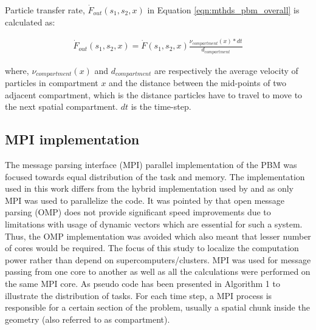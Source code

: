 \documentclass[preprint,10pt,authoryear]{elsarticle}
\begin{document}
\begin{linenumbers}
 Particle transfer rate, $\dot{F}_{out}(s_1,s_2,x)$ in Equation \ref{eqn:mthds_pbm_overall} is calculated 
as:

\begin{align}
\dot{F}_{out}(s_1,s_2,x) = \dot{F}(s_1,s_2,x)\frac{\nu_{compartment}(x)*dt}{d_{compartment}}
\label{eqn:mthds_f_out_dot_part_trans_rate}
\end{align}

where, $\nu_{compartment}(x)$ and $d_{compartment}$ are respectively the average velocity of 
particles in compartment $x$ and the distance between the mid-points of two adjacent compartment, 
which is the distance particles have to travel to move to the next spatial compartment. $dt$ is the 
time-step.

\subsection{MPI implementation}
The message parsing interface (MPI) parallel implementation of the PBM was 
focused towards equal distribution of the task and memory. The implementation 
used in this work differs from the hybrid implementation used by \citep{Bettencourt2017}
and \citep{Sampat2018} as only MPI was used to parallelize the code. It 
was pointed by \citep{Sampat2018} that open message parsing (OMP) does not 
provide significant speed improvements due to limitations with usage of 
dynamic vectors which are essential for such a system. Thus, the OMP 
implementation was avoided which also meant that lesser number of cores 
would be required. The focus of this study to localize the computation power 
rather than depend on supercomputers/clusters. MPI was used for message passing 
from one core to another as well as all the calculations  
were performed on the same MPI core. As pseudo code has been presented in Algorithm 1 
to illustrate the distribution of tasks. For each time step, a MPI process is responsible 
for a certain section of the problem, usually a spatial chunk inside the geometry 
(also referred to as compartment).  


\end{linenumbers}
\end{document}
